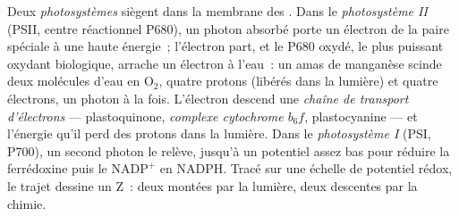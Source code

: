 \begin{definition}\label{def:b1:photosynthesis:zscheme}
Deux \emph{photosystèmes} siègent dans la membrane des . Dans
le \emph{photosystème II} (PSII, centre réactionnel P680), un photon
absorbé porte un électron de la paire spéciale à une haute énergie~;
l'électron part, et le P680 oxydé, le plus puissant oxydant biologique,
arrache un électron à l'eau~: un amas de manganèse scinde deux molécules
d'eau en $\mathrm{O_2}$, quatre protons (libérés dans la lumière) et
quatre électrons, un photon à la fois. L'électron descend une
\emph{chaîne de transport d'électrons} --- plastoquinone,
\emph{complexe cytochrome $b_6f$}, plastocyanine --- et l'énergie qu'il
perd  des protons dans la lumière. Dans le \emph{photosystème I}
(PSI, P700), un second photon le relève, jusqu'à un potentiel assez bas
pour réduire la ferrédoxine puis le $\mathrm{NADP^+}$ en NADPH. Tracé
sur une échelle de potentiel rédox, le trajet dessine un Z~: deux
montées par la lumière, deux descentes par la chimie.
\end{definition}

